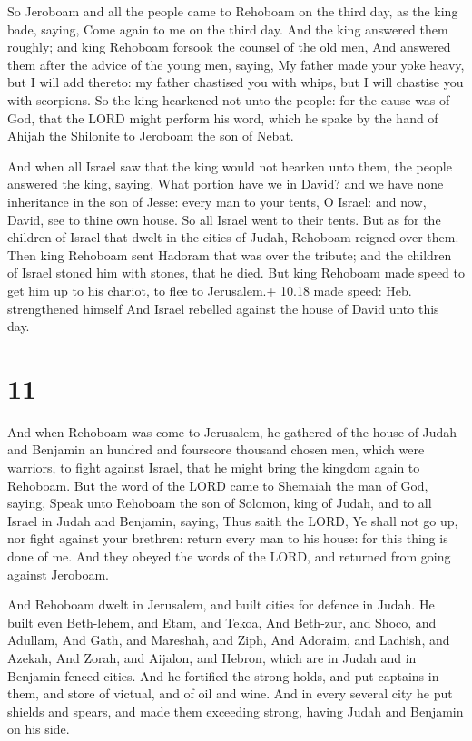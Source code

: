  So Jeroboam and all the people came to Rehoboam on the
third day, as the king bade, saying, Come again to me on the third day.
 And the king answered them roughly; and king Rehoboam
forsook the counsel of the old men,  And answered them
after the advice of the young men, saying, My father made your yoke
heavy, but I will add thereto: my father chastised you with whips, but I
will chastise you with scorpions.  So the king hearkened
not unto the people: for the cause was of God, that the LORD might
perform his word, which he spake by the hand of Ahijah the Shilonite to
Jeroboam the son of Nebat.

 And when all Israel saw that the king would not hearken
unto them, the people answered the king, saying, What portion have we in
David? and we have none inheritance in the son of Jesse: every man to
your tents, O Israel: and now, David, see to thine own house. So all
Israel went to their tents.  But as for the children of
Israel that dwelt in the cities of Judah, Rehoboam reigned over them.
 Then king Rehoboam sent Hadoram that was over the tribute;
and the children of Israel stoned him with stones, that he died. But
king Rehoboam made speed to get him up to his chariot, to flee to
Jerusalem.+ 10.18 made speed: Heb. strengthened himself 
And Israel rebelled against the house of David unto this day.

\hypertarget{section-10}{%
\section{11}\label{section-10}}

 And when Rehoboam was come to Jerusalem, he gathered of the
house of Judah and Benjamin an hundred and fourscore thousand chosen
men, which were warriors, to fight against Israel, that he might bring
the kingdom again to Rehoboam.  But the word of the LORD
came to Shemaiah the man of God, saying,  Speak unto
Rehoboam the son of Solomon, king of Judah, and to all Israel in Judah
and Benjamin, saying,  Thus saith the LORD, Ye shall not go
up, nor fight against your brethren: return every man to his house: for
this thing is done of me. And they obeyed the words of the LORD, and
returned from going against Jeroboam.

 And Rehoboam dwelt in Jerusalem, and built cities for
defence in Judah.  He built even Beth-lehem, and Etam, and
Tekoa,  And Beth-zur, and Shoco, and Adullam, 
And Gath, and Mareshah, and Ziph,  And Adoraim, and Lachish,
and Azekah,  And Zorah, and Aijalon, and Hebron, which are
in Judah and in Benjamin fenced cities.  And he fortified
the strong holds, and put captains in them, and store of victual, and of
oil and wine.  And in every several city he put shields and
spears, and made them exceeding strong, having Judah and Benjamin on his
side.

